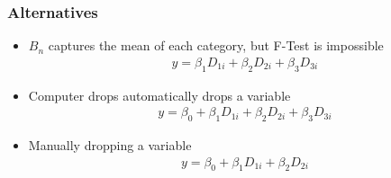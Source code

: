 \subsubsection{Alternatives}
\begin{itemize}
	\item $B_n$ captures the mean of each category, but F-Test is impossible\begin{align} y = \beta_1 D_{1i} + \beta_2 D_{2i} + \beta_3 D_{3i}\end{align}
	\item Computer drops automatically drops a variable \begin{align} y = \beta_0 + \beta_1 D_{1i} + \beta_2 D_{2i} + \beta_3 D_{3i} \end{align}
	\item Manually dropping a variable \begin{align} y = \beta_0 + \beta_1 D_{1i} + \beta_2 D_{2i} \end{align}
\end{itemize}
